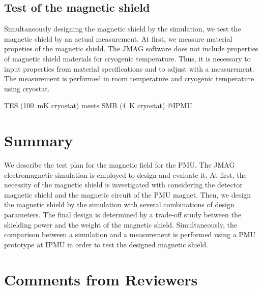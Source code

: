 \documentclass[11pt]{article}
\begin{document}
\subsection{Test of the magnetic shield}

Simultaneously designing the magnetic shield by the simulation, we test the magnetic shield by an actual measurement.
At first, we measure material propeties of the magnetic shield.
The JMAG software does not include properties of magnetic shield materials for cryogenic temperature.
Thus, it is necessary to input properties from material specifications and to adjust with a measurement.
The measurement is performed in room temperature and cryogenic temperature using cryostat.

TES (100~mK cryostat) meets SMB (4~K cryostat) @IPMU

\section{Summary}
We describe the test plan for the magnetic field for the PMU.
The JMAG electromagnetic simulation is employed to design and evaluate it.
At first, the necessity of the magnetic shield is investigated with considering the detector magnetic shield and the magnetic circuit of the PMU magnet.
Then, we design the magnetic shield by the simulation with several combinations of design parameters.
The final design is determined by a trade-off study between the shielding power and the weight of the magnetic shield.
Simultaneously, the comparison between a simulation and a measurement is performed using a PMU prototype at IPMU in order to test the designed magnetic shield.

\newpage
\section*{Comments from Reviewers}
\end{document}
